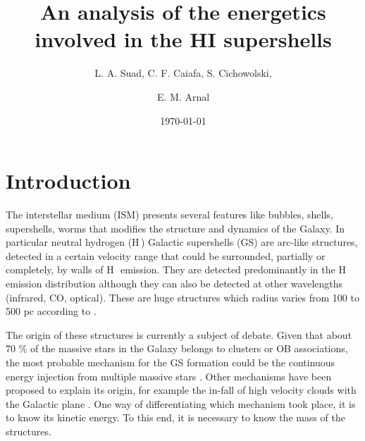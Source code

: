 \documentclass{aa}
\newcommand{\hi}{\mbox{H\,\sc{i}}}
\begin{document}
\title{An analysis of the energetics involved in the HI supershells}




\author{L. A. Suad, C. F. Caiafa, S. Cichowolski, \and E. M. Arnal}

%




\date{\today}
%

\abstract{}{}{}{}{} 




   \maketitle


\section{Introduction}\label{intro}


The interstellar medium (ISM) presents several features like bubbles, shells, supershells, worms that modifies the structure and dynamics of the Galaxy. In particular neutral hydrogen (\hi) Galactic supershells (GS) are arc-like structures, detected in a certain velocity range that could be surrounded, partially or completely, by walls of \hi\, emission. They are detected predominantly in the \hi\, emission distribution  although they can also be detected at other wavelengths (infrared, CO, optical). These are huge structures which radius varies from 100 to 500 pc according to \cite{sua14}.

The origin of these structures is currently a subject of debate. Given that about 70 \% of the massive stars in the Galaxy belongs to clusters or OB associations, the most probable mechanism for the GS formation could be the continuous energy injection from multiple massive stars \citep{nav16}. Other mechanisms have been proposed to explain its origin, for example the in-fall of high velocity clouds with the Galactic plane \citep{ten81}. One way of differentiating  which mechanism took place, it is to know its kinetic energy. To this end, it is necessary to know the mass of the structures.
\end{document}
